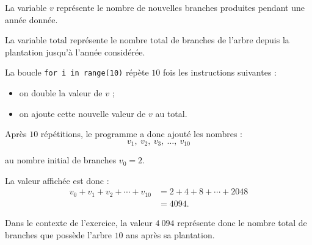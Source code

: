 \documentclass[10pt]{article}
\begin{document}
\begin{enumerate}
\begin{enumerate}
					La variable $v$ représente le nombre de nouvelles branches produites pendant une année donnée.
					
					La variable $\text{total}$ représente le nombre total de branches de l'arbre depuis la plantation jusqu'à l'année considérée.
					
					La boucle \texttt{for i in range(10)} répète $10$ fois les instructions suivantes :
					\begin{itemize}[left=5mm,label={\textbullet~~}]
						\item on double la valeur de $v$ ;
						\item on ajoute cette nouvelle valeur de $v$ au total.
					\end{itemize}
					
					Après $10$ répétitions, le programme a donc ajouté les nombres :
					\[
					v_1,\ v_2,\ v_3,\ \ldots,\ v_{10}
					\]
					
					au nombre initial de branches $v_0=2$.
					
					La valeur affichée est donc :
					\begin{align*}
						v_0+v_1+v_2+\cdots+v_{10}
						&=2+4+8+\cdots+2048\\
						&=4094.
					\end{align*}
					
					Dans le contexte de l'exercice, la valeur $4\ 094$ représente donc le nombre total de branches que possède l'arbre $10$ ans après sa plantation.
				\end{enumerate}
			\end{enumerate}

\clearpage
\end{document}
